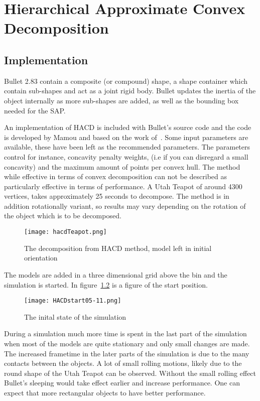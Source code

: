 \chapter{Hierarchical Approximate Convex Decomposition}\label{sec:hacd}
\section{Implementation}
Bullet 2.83 contain a
composite (or compound) shape, a shape container which contain sub-shapes and act
as a joint rigid body. Bullet updates the inertia of the object internally as
more sub-shapes are added, as well as the bounding box needed for the SAP.

An implementation of HACD is included with Bullet's source code and the code is
developed by Mamou and based on the work of~\cite{mamou}. Some input parameters are available, these have been
left as the recommended parameters. The parameters control for instance, concavity
penalty weights, (i.e if you can disregard a small concavity)
and the maximum amount of points per convex hull.
The method while effective in terms of convex decomposition can not be described as
particularly effective in terms of performance. A Utah Teapot of around 4300 vertices,
takes approximately 25 seconds to decompose. The method is in addition rotationally
 variant, so results may vary depending on the rotation of the object which is to be decomposed.

 \begin{figure}[H]
   \centering
   \texttt{[image: hacdTeapot.png]}
   \caption{The decomposition from HACD method, model left in initial orientation}
   \label{fig:HACD}
 \end{figure}

The models are added in a three dimensional grid above the bin and the simulation
is started. In figure~\ref{fig:hacdStart} is a figure of the start position.

\begin{figure}[H]
  \centering
  \texttt{[image: HACDstart05-11.png]}
  \caption{The inital state of the simulation}
  \label{fig:hacdStart}
\end{figure}

During a simulation much more time is spent in the last
part of the simulation when most of the models are quite stationary and only small
changes are made. The increased frametime in the later parts of the simulation is
due to the many contacts between the objects. A lot of small rolling motions, likely due to the round
shape of the Utah Teapot can be observed. Without the small rolling effect Bullet's
sleeping would take effect earlier and increase performance. One can expect that
more rectangular objects to have better performance.

